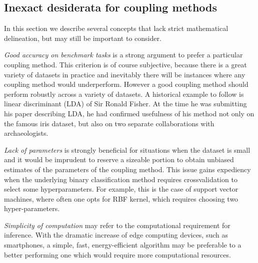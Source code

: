 %


\subsection{Inexact desiderata for coupling methods}

\label{sec:des:inexact}

In this section we describe several concepts that lack strict mathematical delineation, but may still be important to consider.

\emph{Good accuracy on benchmark tasks} is  a strong argument to prefer a particular coupling method. This criterion is of course subjective, because there is a great variety of datasets in practice and inevitably there will be instances where any coupling method would underperform. However a good coupling method should perform robustly across a variety of datasets. A historical  example to follow is linear discriminant (LDA) of  Sir Ronald Fisher. At the time he was submitting his paper describing LDA, he had confirmed usefulness of his method not only on the famous iris dataset, but also on two separate collaborations with archaeologists. 

\emph{Lack of parameters} is strongly beneficial for situations when the dataset is small and it would be imprudent to reserve a sizeable portion to obtain unbiased estimates of the parameters of the coupling method. This issue gains expediency when the underlying binary classification method requires crossvalidation to select some hyperparameters. For example, this is the case of support vector machines, where often one opts for RBF kernel, which requires choosing two hyper-parameters. 

\emph{Simplicity of computation}  may refer to the computational requirement for inference. With the dramatic increase of edge computing devices, such as smartphones, a simple, fast, energy-efficient algorithm may be preferable to a better performing one which would require more computational resources. 

